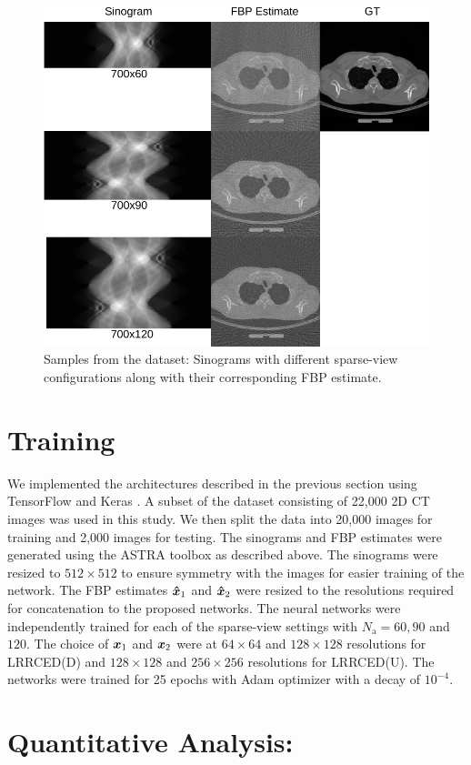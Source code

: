 \begin{figure}[!htbp]
	\centering
	\includegraphics[width=0.8\linewidth]{./Figures/data-crop.pdf}
	\caption{Samples from the dataset: Sinograms with different sparse-view configurations along with their corresponding \ac{FBP} estimate.}
	\label{fig:data}
\end{figure}


\section{Training}

We implemented the architectures described in the previous section using TensorFlow \cite{abadi2016tensorflow} and Keras \cite{chollet2015keras}. A subset of the dataset consisting of 22,000 \ac{2D} \ac{CT} images was used in this study. We then split the data into 20,000 images for training and 2,000 images for testing. The sinograms and \ac{FBP} estimates were generated using the ASTRA toolbox as described above. The sinograms were resized to $512 \times 512$ to ensure symmetry with the images for easier training of the network. The \ac{FBP} estimates $\bm{\hat{x}}_1$ and $\bm{\hat{x}}_2$ were resized to the resolutions required for concatenation to the proposed networks. The neural networks were independently trained for each of the sparse-view settings with $N_\mathrm{a}=60,90$ and $120$. The choice of $\bm{x}_1$ and $\bm{x}_2$ were at $64\times64$ and $128\times128$ resolutions for \ac{LRRCED}(D) and $128\times128$ and $256\times256$ resolutions for \ac{LRRCED}(U). The networks were trained for 25 epochs with Adam optimizer with a decay of $10^{-4}$.


\section{Quantitative Analysis:}

